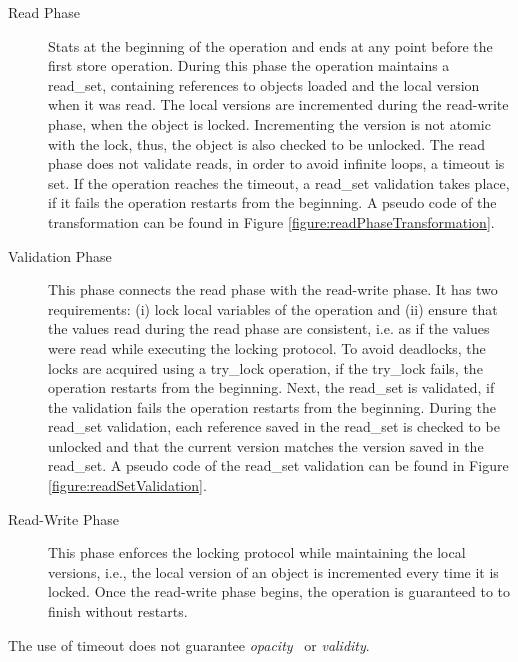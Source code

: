 \documentclass{article}
\newcommand{\code}[1]{\textsf{#1}}
\newcommand{\readSet}{\code{read\_set}\xspace}
\begin{document}
\begin{description}
  \item[Read Phase] Stats at the beginning of the operation and
  ends at any point before the first store operation. 
  During this phase the operation maintains a \readSet, 
  containing references to objects loaded and the local 
  version when it was read. The local versions are incremented 
  during the read-write phase, when the object is locked. 
  Incrementing the version is not atomic with the lock, thus, 
  the object is also checked to be unlocked. 
  The read phase does not validate reads, 
  in order to avoid infinite loops, a timeout is set. 
  If the operation reaches the timeout, 
  a \readSet validation takes place, if it fails 
  the operation restarts from the beginning.
  A pseudo code of the transformation can be found in 
  Figure \ref{figure:readPhaseTransformation}. 
  
  \item[Validation Phase] This phase connects the read phase
  with the read-write phase. It has two requirements: (i) lock 
  local variables of the operation and (ii) ensure that the 
  values read during the read phase are consistent, i.e.
  as if the values were read while executing the locking 
  protocol. To avoid deadlocks, the locks are acquired using 
  a \code{try\_lock} operation, if the \code{try\_lock} fails, 
  the operation restarts from the beginning. Next, the \readSet 
  is validated, if the validation fails the operation restarts from the
  beginning. During the \readSet validation, each reference saved 
  in the \readSet is checked to be unlocked and that the current 
  version matches the version saved in the \readSet. 
  A pseudo code of the \readSet validation can be found in
  Figure \ref{figure:readSetValidation}.
  
  \item[Read-Write Phase] This phase enforces the locking protocol
  while maintaining the local versions, i.e., the local version of 
  an object is incremented every time it is locked.  
  Once the read-write phase begins, the operation is guaranteed to to 
  finish without restarts.  
\end{description}

The use of timeout does not guarantee
\emph{opacity}~\cite{GuerraouiK2008} or 
\emph{validity}\cite{LevAriCK2014}. 

 
\end{document}
